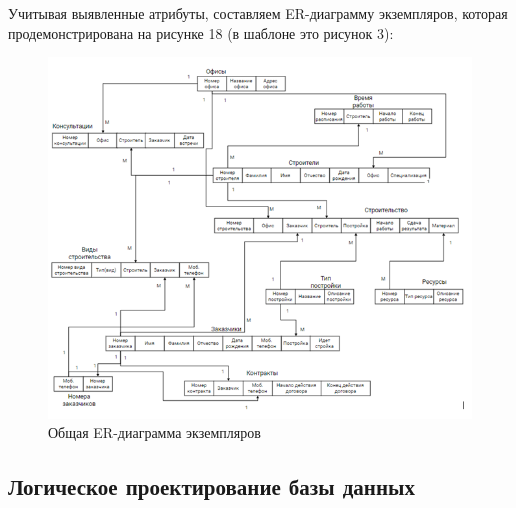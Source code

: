 \documentclass{../SIBGU-state}
\begin{document}
Учитывая	выявленные	атрибуты,	составляем	ER-диаграмму экземпляров, которая продемонстрирована на рисунке 18 (в шаблоне это рисунок 3): \par
\begin{figure}[htb]
	\centering
	\includegraphics[width=1\textwidth]{ris/ris3.png}
	\parskip=1pt
	\caption{Общая ER-диаграмма экземпляров}
	\label{fig:in_appendix}
\end{figure}\par

\subsection{Логическое проектирование базы данных}
\end{document}
